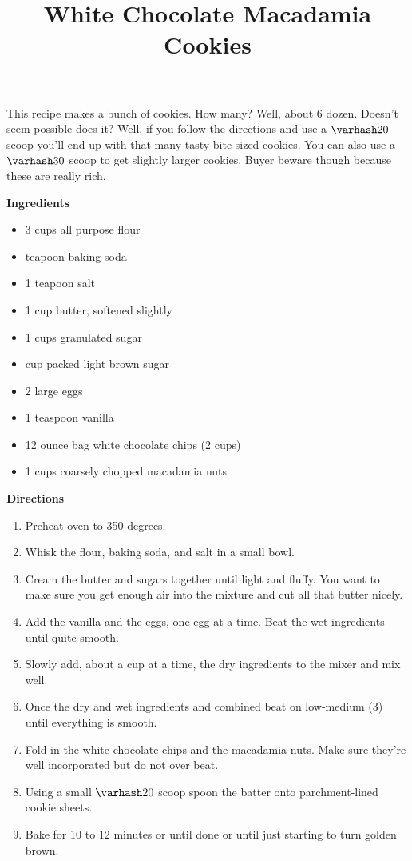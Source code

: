 \documentclass{article}
\title{White Chocolate Macadamia Cookies}
\begin{document}
This recipe makes a bunch of cookies. How many? Well, about 6 dozen. Doesn't seem possible does it? Well,
if you follow the directions and use a $\varhash 20$ scoop you'll end up with that many tasty bite-sized
cookies. You can also use a $\varhash 30$ scoop to get slightly larger cookies. Buyer beware though because
these are really rich.

\textbf{Ingredients}

\begin{multicols}{2}

      \begin{itemize}
            \item 3 cups all purpose flour
            \item {} teapoon baking soda
            \item 1 teapoon salt
            \item 1 cup butter, softened slightly
            \item 1 cups granulated sugar
            \item {} cup packed light brown sugar
            \item 2 large eggs
            \item 1 teaspoon vanilla
            \item 12 ounce bag white chocolate chips (2 cups)
            \item 1 cups coarsely chopped macadamia nuts
      \end{itemize}
\end{multicols}

\textbf{Directions}

\begin{enumerate}
      \item Preheat oven to 350 degrees.
      \item Whisk the flour, baking soda, and salt in a small bowl.
      \item Cream the butter and sugars together until light and fluffy. You want to make sure you get
            enough air into the mixture and cut all that butter nicely.
      \item Add the vanilla and the eggs, one egg at a time. Beat the wet ingredients until quite smooth.
      \item Slowly add, about a cup at a time, the dry ingredients to the mixer and mix well.
      \item Once the dry and wet ingredients and combined beat on low-medium (3) until 
            everything is smooth.
      \item Fold in the white chocolate chips and the macadamia nuts. Make sure they're well
            incorporated but do not over beat.
      \item Using a small $\varhash 20$ scoop spoon the batter onto parchment-lined cookie sheets.
      \item Bake for 10 to 12 minutes or until done or until just starting to turn golden brown.
\end{enumerate}
\end{document}
